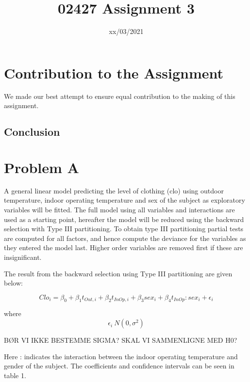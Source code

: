 \documentclass[
]{article}
\title{02427 Assignment 3}
\author{August Thomas Hjortshøj Schreyer s163716 \and }
\date{xx/03/2021}
\begin{document}
\maketitle

{
\setcounter{tocdepth}{2}
\tableofcontents
}
\hypertarget{contribution-to-the-assignment}{%
\section{Contribution to the
Assignment}\label{contribution-to-the-assignment}}

We made our best attempt to ensure equal contribution to the making of
this assignment. \FloatBarrier

\hypertarget{conclusion}{%
\subsection{Conclusion}\label{conclusion}}

\FloatBarrier

\hypertarget{problem-a}{%
\section{Problem A}\label{problem-a}}

A general linear model predicting the level of clothing (clo) using
outdoor temperature, indoor operating temperature and sex of the subject
as exploratory variables will be fitted. The full model using all
variables and interactions are used as a starting point, hereafter the
model will be reduced using the backward selection with Type III
partitioning. To obtain type III partitioning partial tests are computed
for all factors, and hence compute the deviance for the variables as
they entered the model last. Higher order variables are removed first if
these are insignificant.

The result from the backward selection using Type III partitioning are
given below:

\[Clo_i =\beta_0 + \beta_1t_{Out,i} + \beta_2t_{InOp,i} + \beta_3sex_i + \beta_4t_{InOp}:sex_i + \epsilon_i\]

where \[\epsilon_i ~ N(0, \sigma^2)\]

BØR VI IKKE BESTEMME SIGMA? SKAL VI SAMMENLIGNE MED H0?

Here : indicates the interaction between the indoor operating
temperature and gender of the subject. The coefficients and confidence
intervals can be seen in table 1.
\end{document}
